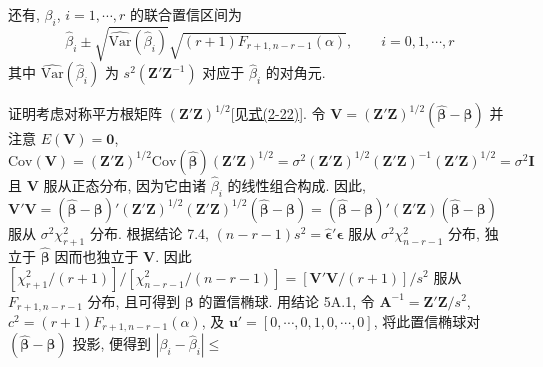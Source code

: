 还有, $\beta_i$, $i=1,\cdots,r$ 的联合置信区间为
\[
\hat{\beta}_i\pm\sqrt{\widehat{\text{Var}}(\hat{\beta}_i)}\sqrt{(r+1)F_{r+1,n-r-1}(\alpha)},\qquad i=0,1,\cdots,r
\]
其中 $\widehat{\text{Var}}(\hat{\beta}_i)$ 为 $s^2(\mathbf{Z}'\mathbf{Z}^{-1})$ 对应于 $\hat{\beta}_i$ 的对角元.

证明\quad 考虑对称平方根矩阵 $(\mathbf{Z}'\mathbf{Z})^{1/2}$[见\hyperref[eq:2-22]{式(2-22)}]. 令 $\mathbf{V}=(\mathbf{Z}'\mathbf{Z})^{1/2}(\hat{\boldsymbol{\beta}}-\boldsymbol{\beta})$ 并注意 $E(\mathbf{V})=\mathbf{0}$,
\[
\text{Cov}(\mathbf{V})=(\mathbf{Z}'\mathbf{Z})^{1/2}\text{Cov}(\hat{\boldsymbol{\beta}})(\mathbf{Z}'\mathbf{Z})^{1/2}=\sigma^2(\mathbf{Z}'\mathbf{Z})^{1/2}(\mathbf{Z}'\mathbf{Z})^{-1}(\mathbf{Z}'\mathbf{Z})^{1/2}=\sigma^2\mathbf{I}
\]
且 $\mathbf{V}$ 服从正态分布, 因为它由诸 $\hat{\beta}_i$ 的线性组合构成. 因此, $\mathbf{V}'\mathbf{V}=(\hat{\boldsymbol{\beta}}-\boldsymbol{\beta})'(\mathbf{Z}'\mathbf{Z})^{1/2}(\mathbf{Z}'\mathbf{Z})^{1/2}(\hat{\boldsymbol{\beta}}-\boldsymbol{\beta})=(\hat{\boldsymbol{\beta}}-\boldsymbol{\beta})'(\mathbf{Z}'\mathbf{Z})(\hat{\boldsymbol{\beta}}-\boldsymbol{\beta})$ 服从 $\sigma^2\chi_{r+1}^2$ 分布. 根据结论 7.4, $(n-r-1)s^2=\hat{\boldsymbol{\epsilon}}'\hat{\boldsymbol{\epsilon}}$ 服从 $\sigma^2\chi_{n-r-1}^2$ 分布, 独立于 $\hat{\boldsymbol{\beta}}$ 因而也独立于 $\mathbf{V}$. 因此 $[\chi_{r+1}^2/(r+1)]/[\chi_{n-r-1}^2/(n-r-1)]=[\mathbf{V}'\mathbf{V}/(r+1)]/s^2$ 服从 $F_{r+1,n-r-1}$ 分布, 且可得到 $\boldsymbol{\beta}$ 的置信椭球. 用结论 5A.1, 令 $\mathbf{A}^{-1}=\mathbf{Z}'\mathbf{Z}/s^2$, $c^2=(r+1)F_{r+1,n-r-1}(\alpha)$, 及 $\mathbf{u}'=[0,\cdots,0,1,0,\cdots,0]$, 将此置信椭球对 $(\hat{\boldsymbol{\beta}}-\boldsymbol{\beta})$ 投影, 便得到 $|\beta_i-\hat{\beta}_i|\leq$
